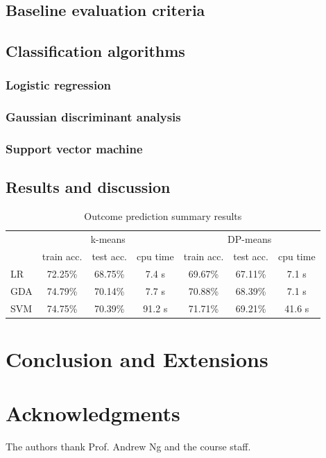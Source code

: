 \documentclass[letterpaper,10 pt,conference]{ieeeconf}
\begin{document}
\subsection{Baseline evaluation criteria}



\subsection{Classification algorithms}

\subsubsection{Logistic regression}



\subsubsection{Gaussian discriminant analysis}



\subsubsection{Support vector machine}



\subsection{Results and discussion}



\begin{table}[htbp!]
  \centering
  \caption{Outcome prediction summary results}
  \begin{tabular}{lcccccc}
    \toprule
    & \multicolumn{3}{c}{k-means} & \multicolumn{3}{c}{DP-means} \\
    & train acc. & test acc. & cpu time & train acc. & test acc. & cpu time \\ \midrule
    LR & 72.25\% & 68.75\% & 7.4 s & 69.67\% & 67.11\% & 7.1 s \\
    GDA & 74.79\% & 70.14\% & 7.7 s & 70.88\% & 68.39\% & 7.1 s \\
    SVM & 74.75\% & 70.39\% & 91.2 s & 71.71\% & 69.21\% & 41.6 s \\
    \bottomrule
  \end{tabular}
  \label{tab:pred}
\end{table}

\section{Conclusion and Extensions}



\section*{Acknowledgments}
The authors thank Prof. Andrew Ng and the course staff.


\end{document}
